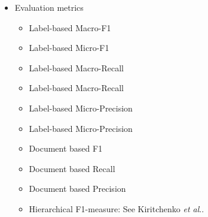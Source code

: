\documentclass{article}
\newcommand\etal{\textit{et al}.\;}
\begin{document}
\begin{itemize}
\begin{itemize}
    \begin{itemize}
      \item BR-KNNa/b: See Spyromitros \etal \cite{spyromitros2008empirical}
      \item 1NN
    \end{itemize}
    \item Linear support vector machine
    \item Logistic Regression
    \item Stochastic Gradient Descent using log-loss (estimating Logistic Regression)
    \item Stacked Classifier: See Hess \etal \cite{hess2008multi}.
      In Contrast to Hess, we use Stochastic Gradient Descent as well as Rocchio
      with log-loss as a bass classifier and
      Decision Trees as a meta-classifier.
    \item Rocchio Classifier: See Sebastiani \cite{sebastiani2002machine}.
  \end{itemize}
  \item Evaluation metrics
  \begin{itemize}
    \item Label-based Macro-F1
    \item Label-based Micro-F1
    \item Label-based Macro-Recall
    \item Label-based Macro-Recall
    \item Label-based Micro-Precision
    \item Label-based Micro-Precision
    \item Document based F1
    \item Document based Recall
    \item Document based Precision
    \item Hierarchical F1-measure: See Kiritchenko \etal \cite{Kiritchenko04familihierarchical}.
  \end{itemize}
\end{itemize}
\end{document}
